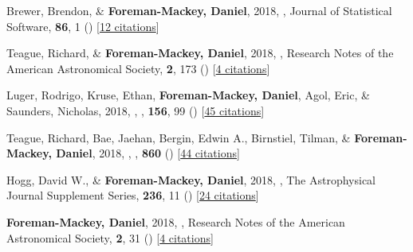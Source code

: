 \item[{\color{numcolor}\scriptsize38}] Brewer, Brendon, \& \textbf{Foreman-Mackey, Daniel}, 2018, , Journal of Statistical Software, \textbf{86}, 1 () [\href{https://scholar.google.com/scholar?cites=789224875040810871}{12 citations}]

\item[{\color{numcolor}\scriptsize37}] Teague, Richard, \& \textbf{Foreman-Mackey, Daniel}, 2018, , Research Notes of the American Astronomical Society, \textbf{2}, 173 () [\href{http://adsabs.harvard.edu/abs/2018RNAAS...2c.173T}{4 citations}]

\item[{\color{numcolor}\scriptsize36}] Luger, Rodrigo, Kruse, Ethan, \textbf{Foreman-Mackey, Daniel}, Agol, Eric, \& Saunders, Nicholas, 2018, , \aj, \textbf{156}, 99 () [\href{http://adsabs.harvard.edu/abs/2018AJ....156...99L}{45 citations}]

\item[{\color{numcolor}\scriptsize35}] Teague, Richard, Bae, Jaehan, Bergin, Edwin A., Birnstiel, Tilman, \& \textbf{Foreman-Mackey, Daniel}, 2018, , \apj, \textbf{860} () [\href{http://adsabs.harvard.edu/abs/2018ApJ...860L..12T}{44 citations}]

\item[{\color{numcolor}\scriptsize34}] Hogg, David W., \& \textbf{Foreman-Mackey, Daniel}, 2018, , The Astrophysical Journal Supplement Series, \textbf{236}, 11 () [\href{http://adsabs.harvard.edu/abs/2018ApJS..236...11H}{24 citations}]

\item[{\color{numcolor}\scriptsize33}] \textbf{Foreman-Mackey, Daniel}, 2018, , Research Notes of the American Astronomical Society, \textbf{2}, 31 () [\href{http://adsabs.harvard.edu/abs/2018RNAAS...2a..31F}{4 citations}]

